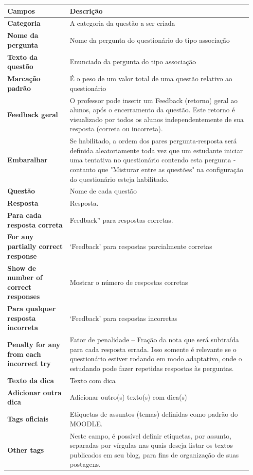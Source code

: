 \begin{longtable}{p{6cm}|p{9cm}}
     \hline
     \rowcolor[rgb]{0.8,0.8,0.8} \textbf{Campos} &  \textbf{Descrição}\\\hline
	\textbf{Categoria} & A categoria da questão a ser criada  \\\hline
    \textbf{Nome da pergunta} & Nome da pergunta do questionário do tipo associação \\\hline
    \textbf{Texto da questão} & Enunciado da pergunta do tipo associação \\\hline
    \textbf{Marcação padrão} & É o peso de um valor total de uma questão relativo ao questionário \\\hline
    \textbf{Feedback geral} & O professor pode inserir um Feedback (retorno)  geral  ao alunos,  após o encerramento da questão. Este retorno é visualizado por todos os alunos independentemente de sua resposta (correta ou incorreta). \\\hline
    \textbf{Embaralhar} & Se habilitado, a ordem dos pares pergunta-resposta será definida aleatoriamente toda vez que um estudante iniciar uma tentativa no questionário contendo esta pergunta - contanto que "Misturar entre as questões" na configuração do questionário esteja habilitado.\\\hline
    \textbf{Questão} & Nome de cada questão \\\hline
    \textbf{Resposta} & Resposta. \\\hline
    \textbf{Para cada resposta correta} & Feedback” para respostas corretas. \\\hline
    \textbf{For any partially correct response} & ‘Feedback’ para respostas parcialmente corretas \\\hline
    \textbf{Show de number of correct responses} & Mostrar o número de respostas corretas \\\hline
    \textbf{Para qualquer resposta incorreta} & ‘Feedback’ para respostas incorretas \\\hline
    \textbf{Penalty for any from each incorrect try} & Fator de penalidade – Fração da nota que será subtraída para cada resposta errada. Isso somente é relevante se o questionário estiver rodando em modo adaptativo, onde o estudando pode fazer repetidas respostas às perguntas.  \\\hline
    \textbf{Texto da dica} & Texto com dica\\\hline
    \textbf{Adicionar outra dica} & Adicionar outro(s) texto(s) com dica(s) \\\hline
    \textbf{Tags oficiais} & Etiquetas de assuntos (temas) definidas como padrão do MOODLE. \\\hline
    \textbf{Other tags} & Neste campo, é possível definir etiquetas, por assunto, separadas por vírgulas nas quais deseja listar os textos publicados em seu blog, para fins de organização de suas postagens.\\\hline
\end{longtable}%

